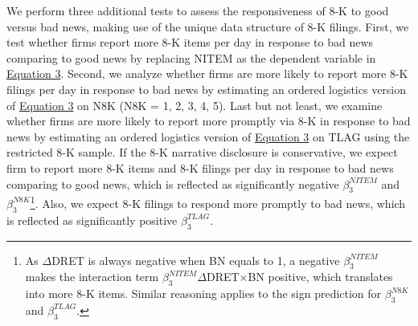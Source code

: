 \documentclass[a4paper]{article}
\begin{document}
\begin{spacing}{2}
We perform three additional tests to assess the responsiveness of 8-K to good versus bad news, making use of the unique data structure of 8-K filings. First, we test whether firms report more 8-K items per day in response to bad news comparing to good news by replacing NITEM as the dependent variable in \hyperref[eq3]{Equation 3}. Second, we analyze whether firms are more likely to report more 8-K filings per day in response to bad news by estimating an ordered logistics version of \hyperref[eq3]{Equation 3} on N8K (N8K = 1, 2, 3, 4, 5). Last but not least, we examine whether firms are more likely to report more promptly via 8-K in response to bad news by estimating an ordered logistics version of \hyperref[eq3]{Equation 3} on TLAG using the restricted 8-K sample. If the 8-K narrative disclosure is conservative, we expect firm to report more 8-K items and 8-K filings per day in response to bad news comparing to good news, which is reflected as significantly negative $\beta_3^{NITEM}$ and $\beta_3^{N8K}$\footnote{As $\Delta$DRET is always negative when BN equals to 1, a negative $\beta_3^{NITEM}$ makes the interaction term $\beta_3^{NITEM}$$\Delta$DRET$\times$BN positive, which translates into more 8-K items. Similar reasoning applies to the sign prediction for $\beta_3^{N8K}$ and $\beta_3^{TLAG}$.}. Also, we expect 8-K filings to respond more promptly to bad news, which is reflected as significantly positive $\beta_3^{TLAG}$.


\end{spacing}
\end{document}

